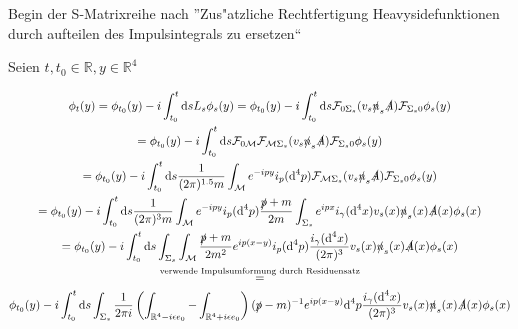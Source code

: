 \documentclass[a4paper,12pt]{article}
\newcommand{\equaltext}[1]{\ensuremath{\stackrel{\text{#1}}{=}}}
\begin{document}
{\Large Begin der S-Matrixreihe nach ''Zus"atzliche Rechtfertigung Heavysidefunktionen durch aufteilen des Impulsintegrals zu ersetzen``}

Seien \(t,t_0\in\mathbb{R}, y\in\mathbb{R}^4\)

\begin{multline}
\phi_t(y)=\phi_{t_0}(y)-i \int_{t_0}^t \text{d}s L_s \phi_s(y)=\phi_{t_0}(y)
-i \int_{t_0}^t \text{d}s\mathcal{F}_{0\Sigma_s}(v_s\slashed{n}_s \slashed{A})\mathcal{F}_{\Sigma_s 0}\phi_s(y)\\
=\phi_{t_0}(y)
-i \int_{t_0}^t \text{d}s\mathcal{F}_{0\mathcal{M}}\mathcal{F}_{\mathcal{M}\Sigma_s}(v_s\slashed{n}_s \slashed{A})\mathcal{F}_{\Sigma_s 0}\phi_s(y)\\
=\phi_{t_0}(y)
-i \int_{t_0}^t \text{d}s \frac{1}{(2\pi)^{1.5}m}\int_{\mathcal{M}}e^{-ipy}i_p(\text{d}^4p) \mathcal{F}_{\mathcal{M}\Sigma_s}(v_s\slashed{n}_s \slashed{A})\mathcal{F}_{\Sigma_s 0}\phi_s(y)\\
=\phi_{t_0}(y)
-i \int_{t_0}^t \text{d}s \frac{1}{(2\pi)^{3}m}\int_{\mathcal{M}}e^{-ipy}i_p(\text{d}^4p) \frac{\slashed{p}+m}{2m}\int_{\Sigma_s}e^{ipx}i_{\gamma}(\text{d}^4x)v_s(x)\slashed{n}_s(x) \slashed{A}(x)\phi_s(x)\\
=\phi_{t_0}(y)
-i \int_{t_0}^t \text{d}s \int_{\Sigma_s}\int_{\mathcal{M}}\frac{\slashed{p}+m}{2m^2}e^{ip(x-y)}i_p(\text{d}^4p) \frac{i_{\gamma}(\text{d}^4x)}{(2\pi)^{3}}v_s(x)\slashed{n}_s(x) \slashed{A}(x)\phi_s(x)\\
\equaltext{verwende Impulsumformung durch Residuensatz}\\
\phi_{t_0}(y)
-i \int_{t_0}^t \text{d}s \int_{\Sigma_s}\frac{1}{2\pi i}   \left( \int_{\mathbb{R}^4-i \epsilon e_0}-\int_{\mathbb{R}^4+i \epsilon e_0} \right) (\slashed{p}-m)^{-1} e^{ip(x-y)}  \text{d}^4p  \frac{i_{\gamma}(\text{d}^4x)}{(2\pi)^{3}}v_s(x)\slashed{n}_s(x) \slashed{A}(x)\phi_s(x)\\
\end{multline} 
\end{document}
